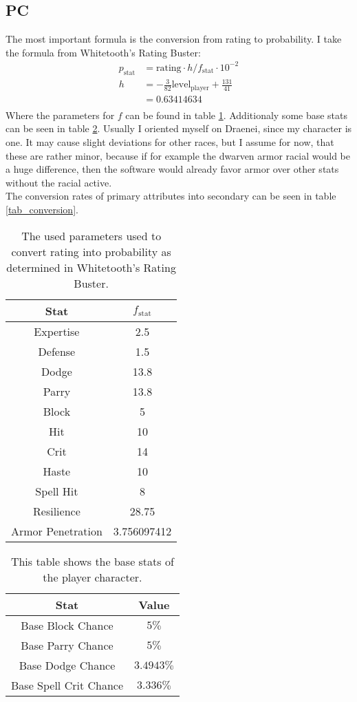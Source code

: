 \documentclass[a4paper,10pt]{article}
\begin{document}
\subsection{PC}
The most important formula is the conversion from rating to probability. I take the formula from Whitetooth's Rating Buster:
\begin{align*}
 p_\mathrm{stat}&=\mathrm{rating}\cdot h/f_\mathrm{stat}\cdot10^{-2}\\
 h&=-\frac{3}{82}\mathrm{level}_\mathrm{player}+\frac{131}{41}\\
 &=0.63414634\\ 
\end{align*}
Where the parameters for $f$ can be found in table \ref{tab_f}. Additionaly some base stats can be seen in table \ref{tab_player_base_stats}. Usually I oriented myself on Draenei, since my character is one. It may cause slight deviations for other races, but I assume for now, that these are rather minor, because if for example the dwarven armor racial would be a huge  difference, then the software would already favor armor over other stats without the racial active.\\ The conversion rates of primary attributes into secondary can be seen in table \ref{tab_conversion}.
\begin{table}
 \centering 
 \begin{tabular}{c|c}
  Stat&$f_\mathrm{stat}$\\
  \hline 
  Expertise&2.5\\
  Defense&1.5\\
  Dodge&13.8\\
  Parry&13.8\\
  Block&5\\
  Hit&10\\
  Crit&14\\
  Haste&10\\
  Spell Hit &8\\
  Resilience&28.75\\
  Armor Penetration&3.756097412
 \end{tabular}
\caption{The used parameters used to convert rating into probability as determined in Whitetooth's Rating Buster.}
\label{tab_f}
\end{table}


\begin{table}
 \centering 
 \begin{tabular}{c|c}
 Stat&Value\\
 \hline
  Base Block Chance& $5\%$\\
  Base Parry Chance &$5\%$\\
  Base Dodge Chance & $3.4943\%$\\
  Base Spell Crit Chance & $3.336\%$
 \end{tabular}
\caption{This table shows the base stats of the player character.}
\label{tab_player_base_stats}
\end{table}
\end{document}
